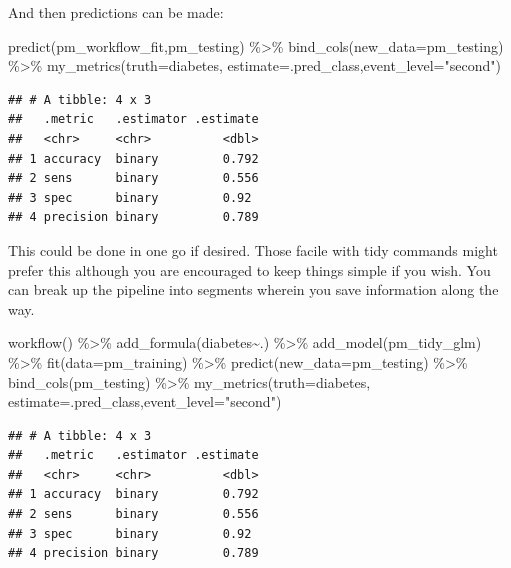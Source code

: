 \documentclass[
]{article}
\newenvironment{Shaded}{\begin{snugshade}}{\end{snugshade}}
\newcommand{\AttributeTok}[1]{\textcolor[rgb]{0.77,0.63,0.00}{#1}}
\newcommand{\FunctionTok}[1]{\textcolor[rgb]{0.00,0.00,0.00}{#1}}
\newcommand{\NormalTok}[1]{#1}
\newcommand{\SpecialCharTok}[1]{\textcolor[rgb]{0.00,0.00,0.00}{#1}}
\newcommand{\StringTok}[1]{\textcolor[rgb]{0.31,0.60,0.02}{#1}}
\begin{document}
And then predictions can be made:

\begin{Shaded}
\begin{Highlighting}[]
\FunctionTok{predict}\NormalTok{(pm\_workflow\_fit,pm\_testing) }\SpecialCharTok{\%\textgreater{}\%}
  \FunctionTok{bind\_cols}\NormalTok{(}\AttributeTok{new\_data=}\NormalTok{pm\_testing) }\SpecialCharTok{\%\textgreater{}\%}
  \FunctionTok{my\_metrics}\NormalTok{(}\AttributeTok{truth=}\NormalTok{diabetes, }\AttributeTok{estimate=}\NormalTok{.pred\_class,}\AttributeTok{event\_level=}\StringTok{"second"}\NormalTok{) }
\end{Highlighting}
\end{Shaded}

\begin{verbatim}
## # A tibble: 4 x 3
##   .metric   .estimator .estimate
##   <chr>     <chr>          <dbl>
## 1 accuracy  binary         0.792
## 2 sens      binary         0.556
## 3 spec      binary         0.92 
## 4 precision binary         0.789
\end{verbatim}

This could be done in one go if desired. Those facile with tidy commands
might prefer this although you are encouraged to keep things simple if
you wish. You can break up the pipeline into segments wherein you save
information along the way.

\begin{Shaded}
\begin{Highlighting}[]
\FunctionTok{workflow}\NormalTok{() }\SpecialCharTok{\%\textgreater{}\%}
  \FunctionTok{add\_formula}\NormalTok{(diabetes}\SpecialCharTok{\textasciitilde{}}\NormalTok{.) }\SpecialCharTok{\%\textgreater{}\%} 
  \FunctionTok{add\_model}\NormalTok{(pm\_tidy\_glm) }\SpecialCharTok{\%\textgreater{}\%} 
  \FunctionTok{fit}\NormalTok{(}\AttributeTok{data=}\NormalTok{pm\_training) }\SpecialCharTok{\%\textgreater{}\%}
  \FunctionTok{predict}\NormalTok{(}\AttributeTok{new\_data=}\NormalTok{pm\_testing) }\SpecialCharTok{\%\textgreater{}\%}
  \FunctionTok{bind\_cols}\NormalTok{(pm\_testing) }\SpecialCharTok{\%\textgreater{}\%}
  \FunctionTok{my\_metrics}\NormalTok{(}\AttributeTok{truth=}\NormalTok{diabetes, }\AttributeTok{estimate=}\NormalTok{.pred\_class,}\AttributeTok{event\_level=}\StringTok{"second"}\NormalTok{) }
\end{Highlighting}
\end{Shaded}

\begin{verbatim}
## # A tibble: 4 x 3
##   .metric   .estimator .estimate
##   <chr>     <chr>          <dbl>
## 1 accuracy  binary         0.792
## 2 sens      binary         0.556
## 3 spec      binary         0.92 
## 4 precision binary         0.789
\end{verbatim}
\end{document}
